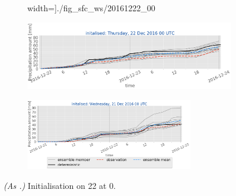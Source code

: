 \begin{figure}[H]
\begin{subfigure}[b]{0.9\textwidth}
   		width=\textwidth]{./fig_sfc_ws/20161222_00}
   		\caption{}\label{fig:res:sfc_ws22}
   	\end{subfigure}
   	\begin{subfigure}[b]{0.9\textwidth}
   		\includegraphics[trim={0.cm 1.5cm 0cm 0cm},clip,
   		width=\textwidth]{./fig_sfc_precip/20161222_00}
   		\caption{}\label{fig:res:sfc_precip22}
   	\end{subfigure}
   	\begin{subfigure}[b]{\textwidth}
   		\centering
   		\includegraphics[trim={5.5cm 0cm 5.cm 17.7cm},clip,
   		width=0.8\textwidth]{./fig_sfc_precip/20161221_00_label}
   	\end{subfigure}
   	\caption{\textit{(As .)} Initialisation on \SI{22}{\dec} at \SI{0}{\UTC}. }\label{fig:obs_meps:22}
   \end{figure}
